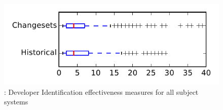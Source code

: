 
\begin{figure}
\centering
\includegraphics[height=0.4\textheight]{figures/dit/rq2_tiny}
\caption{\dtwo: Developer Identification effectiveness measures for all subject systems}
\label{fig:dit:rq2:tiny}
\end{figure}

